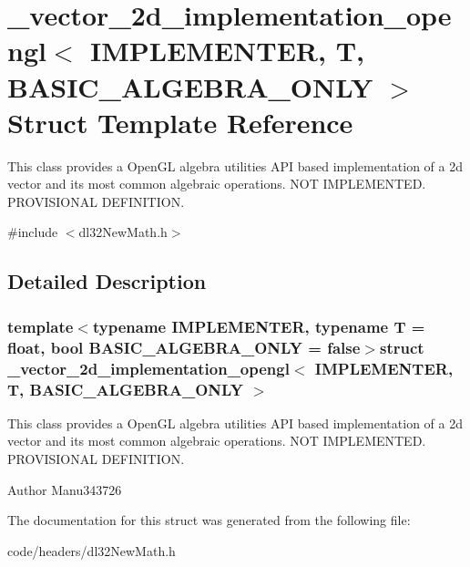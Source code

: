 \hypertarget{struct__vector__2d__implementation__opengl}{\section{\-\_\-vector\-\_\-2d\-\_\-implementation\-\_\-opengl$<$ I\-M\-P\-L\-E\-M\-E\-N\-T\-E\-R, T, B\-A\-S\-I\-C\-\_\-\-A\-L\-G\-E\-B\-R\-A\-\_\-\-O\-N\-L\-Y $>$ Struct Template Reference}
\label{struct__vector__2d__implementation__opengl}
}


This class provides a Open\-G\-L algebra utilities A\-P\-I based implementation of a 2d vector and its most common algebraic operations. N\-O\-T I\-M\-P\-L\-E\-M\-E\-N\-T\-E\-D. P\-R\-O\-V\-I\-S\-I\-O\-N\-A\-L D\-E\-F\-I\-N\-I\-T\-I\-O\-N.  




{\ttfamily \#include $<$dl32\-New\-Math.\-h$>$}



\subsection{Detailed Description}
\subsubsection*{template$<$typename I\-M\-P\-L\-E\-M\-E\-N\-T\-E\-R, typename T = float, bool B\-A\-S\-I\-C\-\_\-\-A\-L\-G\-E\-B\-R\-A\-\_\-\-O\-N\-L\-Y = false$>$struct \-\_\-vector\-\_\-2d\-\_\-implementation\-\_\-opengl$<$ I\-M\-P\-L\-E\-M\-E\-N\-T\-E\-R, T, B\-A\-S\-I\-C\-\_\-\-A\-L\-G\-E\-B\-R\-A\-\_\-\-O\-N\-L\-Y $>$}

This class provides a Open\-G\-L algebra utilities A\-P\-I based implementation of a 2d vector and its most common algebraic operations. N\-O\-T I\-M\-P\-L\-E\-M\-E\-N\-T\-E\-D. P\-R\-O\-V\-I\-S\-I\-O\-N\-A\-L D\-E\-F\-I\-N\-I\-T\-I\-O\-N. 

\begin{DoxyAuthor}{Author}
Manu343726 
\end{DoxyAuthor}


The documentation for this struct was generated from the following file\-:\begin{DoxyCompactItemize}
\item 
code/headers/dl32\-New\-Math.\-h\end{DoxyCompactItemize}
